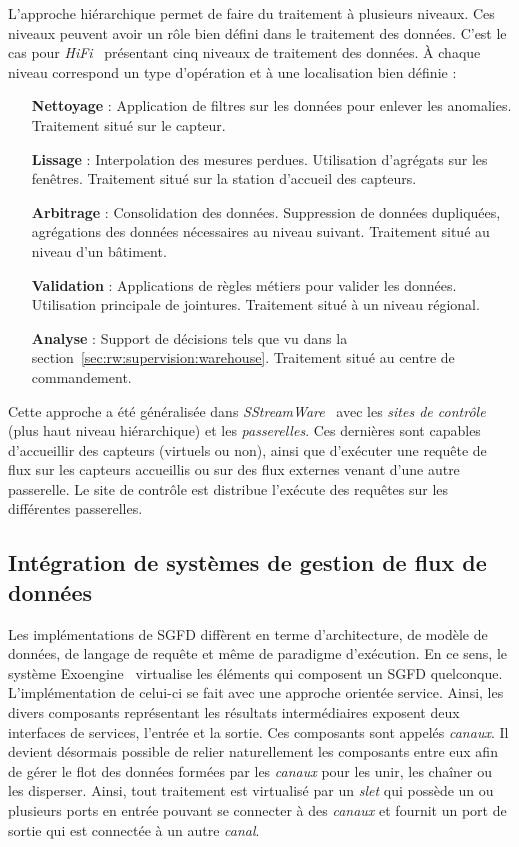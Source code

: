 L'approche hiérarchique permet de faire du traitement à plusieurs niveaux. Ces niveaux peuvent avoir un rôle bien défini dans le traitement des données. C'est le cas pour \textit{HiFi}~\cite{Franklin:hifi} présentant cinq niveaux de traitement des données. À chaque niveau correspond un type d'opération et à une localisation bien définie :
\begin{itemize}
	\item[\textbf{Nettoyage} :] Application de filtres sur les données pour enlever les anomalies. Traitement situé sur le capteur.
	\item[\textbf{Lissage} :] Interpolation des mesures perdues. Utilisation d'agrégats sur les fenêtres. Traitement situé sur la station d'accueil des capteurs.
	\item[\textbf{Arbitrage} :] Consolidation des données. Suppression de données dupliquées, agrégations des données nécessaires au niveau suivant. Traitement situé au niveau d'un bâtiment.
	\item[\textbf{Validation} :] Applications de règles métiers pour valider les données. Utilisation principale de jointures. Traitement situé à un niveau régional.
	\item[\textbf{Analyse} :] Support de décisions tels que vu dans la section~\ref{sec:rw:supervision:warehouse}. Traitement situé au centre de commandement.
\end{itemize}

Cette approche a été généralisée dans \textit{SStreamWare}~\cite{Gurgen:sstreamware} avec les \textit{sites de contrôle} (plus haut niveau hiérarchique) et les \textit{passerelles}. Ces dernières sont capables d'accueillir des capteurs (virtuels ou non), ainsi que d'exécuter une requête de flux sur les capteurs accueillis ou sur des flux externes venant d'une autre passerelle. Le site de contrôle est distribue l'exécute des requêtes sur les différentes passerelles.

\subsection{Intégration de systèmes de gestion de flux de données}
Les implémentations de SGFD diffèrent en terme d'architecture, de modèle de données, de langage de requête et même de paradigme d'exécution. En ce sens, le système Exoengine~\cite{Duller:virtualdsms} virtualise les éléments qui composent un SGFD quelconque. L'implémentation de celui-ci se fait avec une approche orientée service. Ainsi, les divers composants représentant les résultats intermédiaires exposent deux interfaces de services, l'entrée et la sortie. Ces composants sont appelés \textit{canaux}. Il devient désormais possible de relier naturellement les composants entre eux afin de gérer le flot des données formées par les \textit{canaux} pour les unir, les chaîner ou les disperser. Ainsi, tout traitement est virtualisé par un \textit{slet} qui possède un ou plusieurs ports en entrée pouvant se connecter à des \textit{canaux} et fournit un port de sortie qui est connectée à un autre \textit{canal}.

